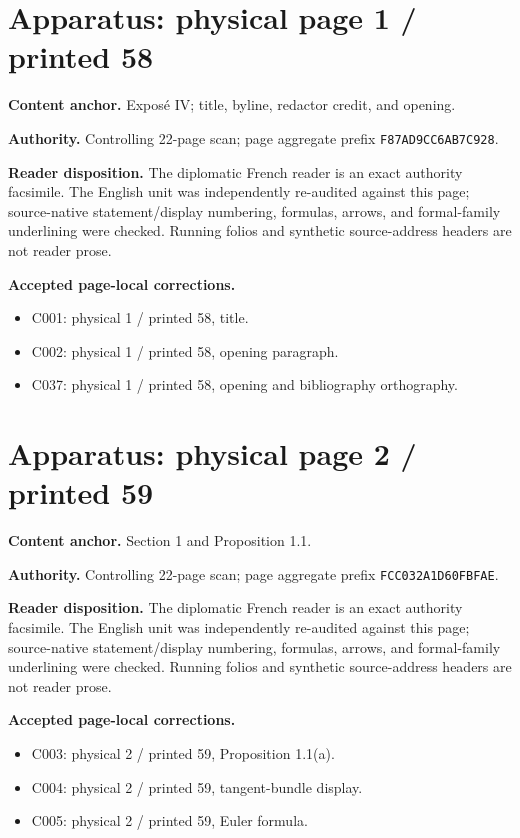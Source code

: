 \documentclass[10pt]{article}
\begin{document}
\setcounter{footnote}{0}
\fontsize{10.2pt}{12.04pt}\selectfont
\section*{Apparatus: physical page 1 / printed 58}
\textbf{Content anchor.} Exposé IV; title, byline, redactor credit, and opening.

\textbf{Authority.} Controlling 22-page scan; page aggregate prefix \texttt{F87AD9CC6AB7C928}.

\textbf{Reader disposition.} The diplomatic French reader is an exact authority facsimile. The English unit was independently re-audited against this page; source-native statement/display numbering, formulas, arrows, and formal-family underlining were checked. Running folios and synthetic source-address headers are not reader prose.

\textbf{Accepted page-local corrections.} \begin{itemize}
\item C001: physical 1 / printed 58, title.
\item C002: physical 1 / printed 58, opening paragraph.
\item C037: physical 1 / printed 58, opening and bibliography orthography.
\end{itemize}
\newpage
\setcounter{footnote}{0}
\fontsize{10.2pt}{12.04pt}\selectfont
\section*{Apparatus: physical page 2 / printed 59}
\textbf{Content anchor.} Section 1 and Proposition 1.1.

\textbf{Authority.} Controlling 22-page scan; page aggregate prefix \texttt{FCC032A1D60FBFAE}.

\textbf{Reader disposition.} The diplomatic French reader is an exact authority facsimile. The English unit was independently re-audited against this page; source-native statement/display numbering, formulas, arrows, and formal-family underlining were checked. Running folios and synthetic source-address headers are not reader prose.

\textbf{Accepted page-local corrections.} \begin{itemize}
\item C003: physical 2 / printed 59, Proposition 1.1(a).
\item C004: physical 2 / printed 59, tangent-bundle display.
\item C005: physical 2 / printed 59, Euler formula.
\end{itemize}
\newpage
\setcounter{footnote}{0}
\fontsize{10.2pt}{12.04pt}\selectfont
\end{document}
